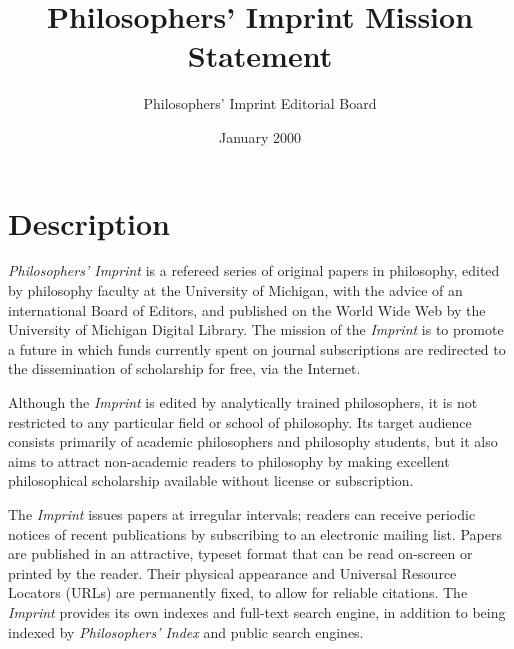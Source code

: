 \documentclass[noflushend]{philosophersimprint}
\begin{document}
\title[Mission Statement]{Philosophers' Imprint Mission Statement}

\author[Editorial Board]{Philosophers' Imprint Editorial Board}


\subject{Goals of Philosophers' Imprint}




\date{January 2000}

\maketitle     	 	

\section{Description}

\emph{Philosophers' Imprint} is a refereed series of original papers
in philosophy, edited by philosophy faculty at the University of
Michigan, with the advice of an international Board of Editors, and
published on the World Wide Web by the University of Michigan Digital
Library. The mission of the \emph{Imprint} is to promote a future in
which funds currently spent on journal subscriptions are redirected to
the dissemination of scholarship for free, via the Internet.

Although the \emph{Imprint} is edited by analytically trained
philosophers, it is not restricted to any particular field or school
of philosophy. Its target audience consists primarily of academic
philosophers and philosophy students, but it also aims to attract
non-academic readers to philosophy by making excellent philosophical
scholarship available without license or subscription.

The \emph{Imprint} issues papers at irregular intervals; readers can
receive periodic notices of recent publications by subscribing to an
electronic mailing list. Papers are published in an attractive,
typeset format that can be read on-screen or printed by the reader.
Their physical appearance and Universal Resource Locators (URLs) are
permanently fixed, to allow for reliable citations. The \emph{Imprint}
provides its own indexes and full-text search engine, in addition to
being indexed by \emph{Philosophers' Index} and public search engines.
\end{document}
